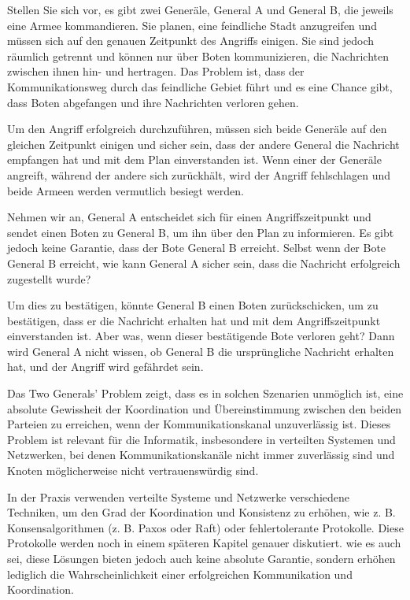 Stellen Sie sich vor, es gibt zwei Generäle, General A und General B, die jeweils eine Armee kommandieren. Sie planen, eine feindliche Stadt anzugreifen und müssen sich auf den genauen Zeitpunkt des Angriffs einigen. Sie sind jedoch räumlich getrennt und können nur über Boten kommunizieren, die Nachrichten zwischen ihnen hin- und hertragen. Das Problem ist, dass der Kommunikationsweg durch das feindliche Gebiet führt und es eine Chance gibt, dass Boten abgefangen und ihre Nachrichten verloren gehen.

Um den Angriff erfolgreich durchzuführen, müssen sich beide Generäle auf den gleichen Zeitpunkt einigen und sicher sein, dass der andere General die Nachricht empfangen hat und mit dem Plan einverstanden ist. Wenn einer der Generäle angreift, während der andere sich zurückhält, wird der Angriff fehlschlagen und beide Armeen werden vermutlich besiegt werden.

Nehmen wir an, General A entscheidet sich für einen Angriffszeitpunkt und sendet einen Boten zu General B, um ihn über den Plan zu informieren. Es gibt jedoch keine Garantie, dass der Bote General B erreicht. Selbst wenn der Bote General B erreicht, wie kann General A sicher sein, dass die Nachricht erfolgreich zugestellt wurde?

Um dies zu bestätigen, könnte General B einen Boten zurückschicken, um zu bestätigen, dass er die Nachricht erhalten hat und mit dem Angriffszeitpunkt einverstanden ist. Aber was, wenn dieser bestätigende Bote verloren geht? Dann wird General A nicht wissen, ob General B die ursprüngliche Nachricht erhalten hat, und der Angriff wird gefährdet sein.

Das Two Generals' Problem zeigt, dass es in solchen Szenarien unmöglich ist, eine absolute Gewissheit der Koordination und Übereinstimmung zwischen den beiden Parteien zu erreichen, wenn der Kommunikationskanal unzuverlässig ist. Dieses Problem ist relevant für die Informatik, insbesondere in verteilten Systemen und Netzwerken, bei denen Kommunikationskanäle nicht immer zuverlässig sind und Knoten möglicherweise nicht vertrauenswürdig sind.

In der Praxis verwenden verteilte Systeme und Netzwerke verschiedene Techniken, um den Grad der Koordination und Konsistenz zu erhöhen, wie z. B. Konsensalgorithmen (z. B. Paxos oder Raft) oder fehlertolerante Protokolle. Diese Protokolle werden noch in einem späteren Kapitel genauer diskutiert. wie es auch sei, diese Lösungen bieten jedoch auch keine absolute Garantie, sondern erhöhen lediglich die Wahrscheinlichkeit einer erfolgreichen Kommunikation und Koordination.

